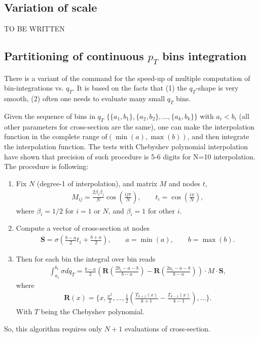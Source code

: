 \documentclass[prd,nofootinbib,eqsecnum,final]{revtex4}
\renewcommand{\(}{\left(}
\renewcommand{\)}{\right)}
\renewcommand{\[}{\left[}
\renewcommand{\]}{\right]}
\renewcommand{\vec}[1]{\bm{#1}}
\begin{document}
\subsection{Variation of scale}
\label{TMDX:c2}

TO BE WRITTEN

\subsection{Partitioning of continuous $p_T$ bins integration}
\label{TMDX_DY:pT-partitioning}

There is a variant of the command for the speed-up of multiple computation of bin-integrations vs. $q_T$. It is based on the facts that (1) the $q_T$-shape is very smooth, (2) often one needs to evaluate many small $q_T$ bins.

Given the sequence of bins in $q_T$ $\{\{a_1,b_1\},\{a_2,b_2\},...,\{a_k,b_k\}\}$ with $a_i<b_i$ (all other parameters for cross-section are the same), one can make the interpolation function in the complete range of$(\min(a),\max(b))$, and then integrate the interpolation function. The tests with Chebyshev polynomial interpolation have shown that precision of such procedure is 5-6 digits for N=10 interpolation. The procedure is following:
\begin{enumerate}
\item Fix $N$ (degree-1 of interpolation), and matrix $M$ and nodes $t$,
\begin{eqnarray}
M_{ij}=\frac{2\beta_i\beta_j}{N}\cos\(\frac{ij \pi}{N}\),\qquad t_i=\cos\(\frac{i\pi}{N}\),
\end{eqnarray}
where $\beta_i=1/2$ for $i=1$ or $N$, and $\beta_i=1$ for other $i$.
\item Compute a vector of cross-section at nodes
\begin{eqnarray}
\vec S=\sigma\(\frac{b-a}{2}t_i+\frac{b+a}{2}\),\qquad a=\min(a),\qquad b=\max(b).
\end{eqnarray}
\item Then for each bin the integral over bin reads
\begin{eqnarray}
\int_{a_i}^{b_i} \sigma dq_T= \frac{b-a}{2}\(\vec R\(\frac{2b_i-a-b}{b-a}\)-\vec R\(\frac{2a_i-a-b}{b-a}\)\)\cdot M \cdot \vec S,
\end{eqnarray}
where 
\begin{eqnarray}
\vec R(x)=\{x,\frac{x^2}{2},...,\frac{1}{2}\(\frac{T_{k+1}(x)}{k+1}-\frac{T_{k-1}(x)}{k-1}\),...\}.
\end{eqnarray}
With $T$ being the Chebyshev polynomial.
\end{enumerate}
So, this algorithm requires only $N+1$ evaluations of cross-section.
\end{document}
